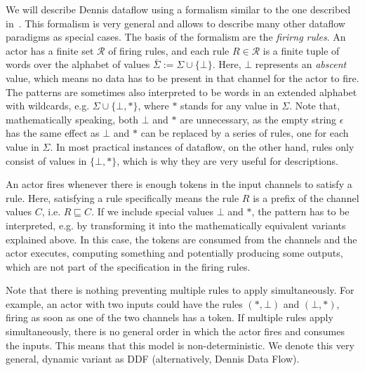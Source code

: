 We will describe Dennis dataflow using a formalism similar to the one described in~\cite{Parks:M95:105,lee_matsikoudis_semantics}.
This formalism is very general and allows to describe many other dataflow paradigms as special cases.
The basis of the formalism are the \emph{firirng rules}.
An actor has a finite set $\mathcal{R}$ of firing rules, and each rule $R \in \mathcal{R}$ is a finite tuple of words over the alphabet of values $\bar \Sigma := \Sigma \cup \{\bot\}$.
Here, $\bot$ represents an \emph{abscent} value, which means no data has to be present in that channel for the actor to fire.
The patterns are sometimes also interpreted to be words in an extended alphabet with wildcards, e.g. $\Sigma \cup \{\bot,*\}$, where $*$ stands for any value in $\Sigma$.
Note that, mathematically speaking, both $\bot$ and $*$ are unnecessary, as the empty string $\epsilon$ has the same effect as $\bot$ and $*$ can be replaced by a series of rules, one for each value in $\Sigma$.
In most practical instances of dataflow, on the other hand, rules only consist of values in $\{\bot,*\}$, which is why they are very useful for descriptions.

An actor fires whenever there is enough tokens in the input channels to satisfy a rule.
Here, satisfying a rule specifically means the rule $R$ is a prefix of the channel values $C$, i.e. $R \sqsubseteq C$.
If we include special values $\bot$ and $*$, the pattern has to be interpreted, e.g. by transforming it into the mathematically equivalent variants explained above.
In this case, the tokens are consumed from the channels and the actor executes, computing something and potentially producing some outputs, which are not part of the specification in the firing rules.

Note that there is nothing preventing multiple rules to apply simultaneously. For example, an actor with two inputs could have the rules $(*,\bot)$ and $(\bot,*)$, firing as soon as one of the two channels has a token.
If multiple rules apply simultaneously, there is no general order in which the actor fires and consumes the inputs. 
This means that this model is non-deterministic.
We denote this very general, dynamic variant as \ac{DDF} (alternatively, Dennis Data Flow).

